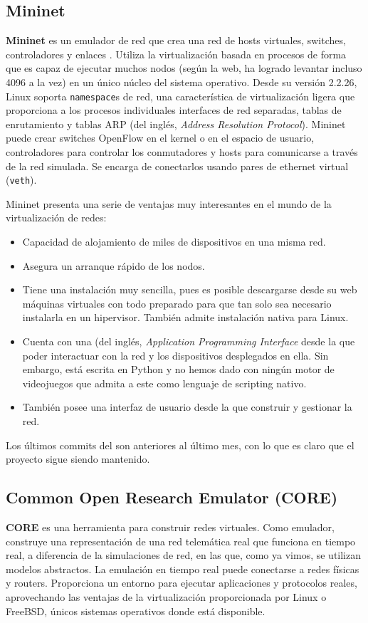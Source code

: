 \subsection{Mininet}
\textbf{Mininet} es un emulador de red que crea una red de hosts virtuales, switches, controladores y enlaces \cite{mininet}. Utiliza la virtualización basada en procesos de forma que es capaz de ejecutar muchos nodos (según la web, ha logrado levantar incluso 4096 a la vez) en un único núcleo del sistema operativo. Desde su versión 2.2.26, Linux soporta \texttt{namespace}s de red, una característica de virtualización ligera que proporciona a los procesos individuales interfaces de red separadas, tablas de enrutamiento y tablas ARP (del inglés, \textit{Address Resolution Protocol}). Mininet puede crear switches OpenFlow en el kernel o en el espacio de usuario, controladores para controlar los conmutadores y hosts para comunicarse a través de la red simulada. Se encarga de conectarlos usando pares de ethernet virtual (\texttt{veth}).

Mininet presenta una serie de ventajas muy interesantes en el mundo de la virtualización de redes:
\begin{itemize}
\item Capacidad de alojamiento de miles de dispositivos en una misma red. 
\item Asegura un arranque rápido de los nodos.
\item Tiene una instalación muy sencilla, pues es posible descargarse desde su web máquinas virtuales con todo preparado para que tan solo sea necesario instalarla en un hipervisor. También admite instalación nativa para Linux.
\item Cuenta con una  (del inglés, \textit{Application Programming Interface} desde la que poder interactuar con la red y los dispositivos desplegados en ella. Sin embargo, está escrita en Python y no hemos dado con ningún motor de videojuegos que admita a este como lenguaje de scripting nativo.
\item También posee una interfaz de usuario desde la que construir y gestionar la red.
\end{itemize}

Los últimos commits del  son anteriores al último mes, con lo que es claro que el proyecto sigue siendo mantenido.

\subsection{Common Open Research Emulator (CORE)}
\textbf{CORE} es una herramienta para construir redes virtuales. Como emulador, construye una representación de una red telemática real que funciona en tiempo real, a diferencia de la simulaciones de red, en las que, como ya vimos, se utilizan modelos abstractos. La emulación en tiempo real puede conectarse a redes físicas y routers. Proporciona un entorno para ejecutar aplicaciones y protocolos reales, aprovechando las ventajas de la virtualización proporcionada por Linux o FreeBSD, únicos sistemas operativos donde está disponible. 


